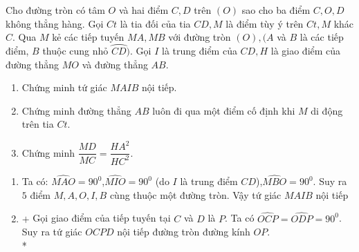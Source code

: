 \begin{ex}%
    Cho đường tròn có tâm $O$ và hai điểm $C,D$ trên $(O)$ sao cho ba điểm $C,O,D$ không thẳng hàng. Gọi $Ct$ là tia đối của tia $CD,M$ là điểm tùy ý trên $Ct,M$ khác $C.$ Qua $M$ kẻ các tiếp tuyến $MA,MB$ với đường tròn $(O),(A$ và $B$ là các tiếp điểm, $B$ thuộc cung nhỏ $\wideparen{CD})$. Gọi $I$ là trung điểm của $CD,H$ là giao điểm của đường thẳng $MO$ và đường thẳng $AB$.
    \begin{enumerate}
        \item Chứng minh tứ giác $MAIB$ nội tiếp.
        \item Chứng minh đường thẳng $AB$ luôn đi qua một điểm cố định khi $M$ di động trên tia $Ct.$
        \item Chứng minh $\dfrac{MD}{MC}=\dfrac{H{{A}^{2}}}{H{{C}^{2}}}$.
    \end{enumerate}
\loigiai
    {
    \begin{center}
    \end{center}
    \begin{enumerate}
        \item 	Ta có: $\widehat {MAO} = {90^0}$,$\widehat {MIO} = {90^0}$ (do $I$ là trung điểm $CD$),$\widehat {MBO} = {90^0}.$ Suy ra $5$ điểm $M,A,O,I,B$ cùng thuộc một đường tròn. Vậy tứ giác $MAIB$ nội tiếp
        \item $+$	Gọi giao điểm của tiếp tuyến tại $C$ và $D$ là $P$. Ta có $\widehat {OCP} = \widehat {ODP} = {90^0}$. Suy ra tứ giác $OCPD$ nội tiếp đường tròn đường kính $OP$. \\*

\end{enumerate}}
\end{ex}
